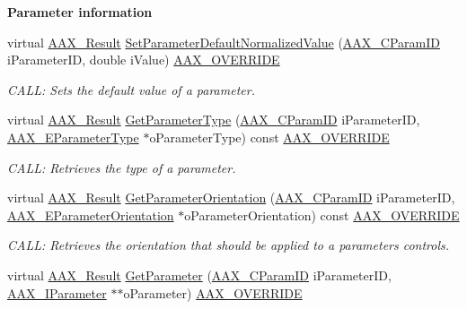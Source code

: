 \begin{Indent}{\bf Parameter information}
\begin{DoxyCompactItemize}
virtual \hyperlink{a00149_a4d8f69a697df7f70c3a8e9b8ee130d2f}{A\+A\+X\+\_\+\+Result} \hyperlink{a00018_a22916f61a1daaf20b5167eb2b2858efc}{Set\+Parameter\+Default\+Normalized\+Value} (\hyperlink{a00149_a1440c756fe5cb158b78193b2fc1780d1}{A\+A\+X\+\_\+\+C\+Param\+I\+D} i\+Parameter\+I\+D, double i\+Value) \hyperlink{a00149_ac2f24a5172689ae684344abdcce55463}{A\+A\+X\+\_\+\+O\+V\+E\+R\+R\+I\+D\+E}
\begin{DoxyCompactList}\small\item\em C\+A\+L\+L\+: Sets the default value of a parameter. \end{DoxyCompactList}\item 
virtual \hyperlink{a00149_a4d8f69a697df7f70c3a8e9b8ee130d2f}{A\+A\+X\+\_\+\+Result} \hyperlink{a00018_a758b3d167753a1e2100295761a26aac4}{Get\+Parameter\+Type} (\hyperlink{a00149_a1440c756fe5cb158b78193b2fc1780d1}{A\+A\+X\+\_\+\+C\+Param\+I\+D} i\+Parameter\+I\+D, \hyperlink{a00206_a4cd0f189daa9a60cf36883c56344bb2e}{A\+A\+X\+\_\+\+E\+Parameter\+Type} $\ast$o\+Parameter\+Type) const \hyperlink{a00149_ac2f24a5172689ae684344abdcce55463}{A\+A\+X\+\_\+\+O\+V\+E\+R\+R\+I\+D\+E}
\begin{DoxyCompactList}\small\item\em C\+A\+L\+L\+: Retrieves the type of a parameter. \end{DoxyCompactList}\item 
virtual \hyperlink{a00149_a4d8f69a697df7f70c3a8e9b8ee130d2f}{A\+A\+X\+\_\+\+Result} \hyperlink{a00018_a67413692bcabae516426f7fc595bbce8}{Get\+Parameter\+Orientation} (\hyperlink{a00149_a1440c756fe5cb158b78193b2fc1780d1}{A\+A\+X\+\_\+\+C\+Param\+I\+D} i\+Parameter\+I\+D, \hyperlink{a00206_a52f91d1c14aa5dceedabfb9d2de31bf0}{A\+A\+X\+\_\+\+E\+Parameter\+Orientation} $\ast$o\+Parameter\+Orientation) const \hyperlink{a00149_ac2f24a5172689ae684344abdcce55463}{A\+A\+X\+\_\+\+O\+V\+E\+R\+R\+I\+D\+E}
\begin{DoxyCompactList}\small\item\em C\+A\+L\+L\+: Retrieves the orientation that should be applied to a parameter\textquotesingle{}s controls. \end{DoxyCompactList}\item 
virtual \hyperlink{a00149_a4d8f69a697df7f70c3a8e9b8ee130d2f}{A\+A\+X\+\_\+\+Result} \hyperlink{a00018_a233b96bc5ef4ff7749f207296bf8b6a3}{Get\+Parameter} (\hyperlink{a00149_a1440c756fe5cb158b78193b2fc1780d1}{A\+A\+X\+\_\+\+C\+Param\+I\+D} i\+Parameter\+I\+D, \hyperlink{a00108}{A\+A\+X\+\_\+\+I\+Parameter} $\ast$$\ast$o\+Parameter) \hyperlink{a00149_ac2f24a5172689ae684344abdcce55463}{A\+A\+X\+\_\+\+O\+V\+E\+R\+R\+I\+D\+E}
$$
\end{DoxyCompactItemize}
\end{Indent}
